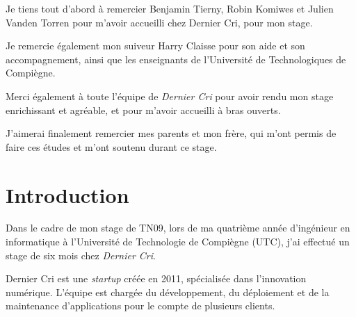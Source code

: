 \documentclass[12pt,a4paper]{article}
\begin{document}
  Je tiens tout d'abord à remercier Benjamin Tierny, Robin Komiwes et
  Julien Vanden Torren pour m'avoir accueilli chez Dernier Cri, pour mon
  stage.

  \bigskip

  Je remercie également mon suiveur Harry Claisse pour son aide et son
  accompagnement, ainsi que les enseignants de l'Université de
  Technologiques de Compiègne.

  \bigskip

  Merci également à toute l'équipe de \emph{Dernier Cri} pour avoir rendu
  mon stage enrichissant et agréable, et pour m'avoir accueilli à bras
  ouverts.

  \bigskip

  J'aimerai finalement remercier mes parents et mon frère, qui m'ont
  permis de faire ces études et m'ont soutenu durant ce stage.

  \newpage

  \section{Introduction}\label{introduction}

  \bigskip

  Dans le cadre de mon stage de TN09, lors de ma quatrième année
  d'ingénieur en informatique à l'Université de Technologie de Compiègne
  (UTC), j'ai effectué un stage de six mois chez \emph{Dernier Cri}.

  \bigskip

  Dernier Cri est une \emph{startup} créée en 2011, spécialisée dans
  l'innovation numérique. L'équipe est chargée du développement, du
  déploiement et de la maintenance d'applications pour le compte de
  plusieurs clients.
\end{document}
